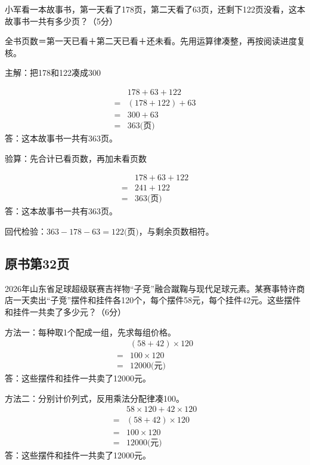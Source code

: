 小军看一本故事书，第一天看了178页，第二天看了63页，还剩下122页没看，这本故事书一共有多少页？（5分）\par
\begin{BookAnswer}
全书页数＝第一天已看＋第二天已看＋还未看。先用运算律凑整，再按阅读进度复核。\par 主解：把178和122凑成300\par \[\begin{aligned} &178+63+122\\={}&(178+122)+63\\={}&300+63\\={}&363\text{(页)}\end{aligned}\]答：这本故事书一共有363页。\par 验算：先合计已看页数，再加未看页数\par \[\begin{aligned} &178+63+122\\={}&241+122\\={}&363\text{(页)}\end{aligned}\]答：这本故事书一共有363页。\par 回代检验：\(363-178-63=122\text{(页)}\)，与剩余页数相符。
\end{BookAnswer}



\subsection*{原书第32页}

2026年山东省足球超级联赛吉祥物“子竞”融合蹴鞠与现代足球元素。某赛事特许商店一天卖出“子竞”摆件和挂件各120个，每个摆件58元，每个挂件42元。这些摆件和挂件一共卖了多少元？（6分）\par
\begin{BookAnswer}
方法一：每种取1个配成一组，先求每组价格。\[\begin{aligned}&(58+42)\times120\\={}&100\times120\\={}&12000\text{(元)}\end{aligned}\]答：这些摆件和挂件一共卖了12000元。\par 方法二：分别计价列式，反用乘法分配律凑100。\[\begin{aligned}&58\times120+42\times120\\={}&(58+42)\times120\\={}&100\times120\\={}&12000\text{(元)}\end{aligned}\]答：这些摆件和挂件一共卖了12000元。
\end{BookAnswer}

